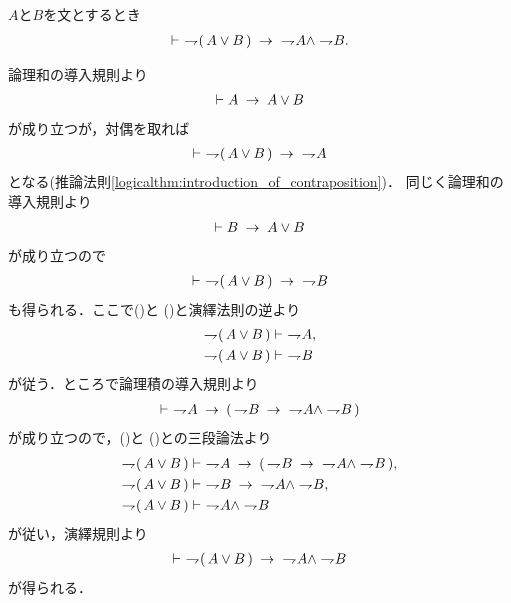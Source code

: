 	\begin{screen}
		\begin{logicalthm}
		\label{logicalthm:weak_De_Morgan_law_2}
			$A$と$B$を文とするとき
			\begin{align}
				\vdash\ \rightharpoondown\hspace{-0.25em} (\, A \vee B\, ) 
				\hspace{0.25em}\rightarrow\hspace{0.25em}\ \rightharpoondown\hspace{-0.25em} A \wedge \rightharpoondown\hspace{-0.25em} B.
			\end{align}
		\end{logicalthm}
	\end{screen}
	
	\begin{prf}
		論理和の導入規則より
		\begin{align}
			\vdash A \hspace{0.25em}\rightarrow\hspace{0.25em} A \vee B
		\end{align}
		が成り立つが，対偶を取れば
		\begin{align}
			\vdash\ \rightharpoondown\hspace{-0.25em} (\, A \vee B\, ) \hspace{0.25em}\rightarrow\hspace{0.25em}\ \rightharpoondown\hspace{-0.25em} A
			\label{fom:weak_De_Morgan_law_2_1}
		\end{align}
		となる(推論法則\ref{logicalthm:introduction_of_contraposition})．
		同じく論理和の導入規則より
		\begin{align}
			\vdash B \hspace{0.25em}\rightarrow\hspace{0.25em} A \vee B
		\end{align}
		が成り立つので
		\begin{align}
			\vdash\ \rightharpoondown\hspace{-0.25em} (\, A \vee B\, ) \hspace{0.25em}\rightarrow\hspace{0.25em}\ \rightharpoondown\hspace{-0.25em} B
			\label{fom:weak_De_Morgan_law_2_2}
		\end{align}
		も得られる．ここで()と
		()と演繹法則の逆より
		\begin{align}
			\rightharpoondown\hspace{-0.25em} (\, A \vee B\, ) &\vdash\ \rightharpoondown\hspace{-0.25em} A, 
			\label{fom:weak_De_Morgan_law_2_3} \\
			\rightharpoondown\hspace{-0.25em} (\, A \vee B\, ) &\vdash\ \rightharpoondown\hspace{-0.25em} B
			\label{fom:weak_De_Morgan_law_2_4}
		\end{align}
		が従う．ところで論理積の導入規則より
		\begin{align}
			\vdash\ \rightharpoondown\hspace{-0.25em} A \hspace{0.25em}\rightarrow\hspace{0.25em} (\, \rightharpoondown\hspace{-0.25em} B \hspace{0.25em}\rightarrow\hspace{0.25em}\
			\rightharpoondown\hspace{-0.25em} A \wedge \rightharpoondown\hspace{-0.25em} B\, )
		\end{align}
		が成り立つので，()と
		()との三段論法より
		\begin{align}
			\negation (\, A \vee B\, ) &\vdash\ \negation A \rarrow 
				(\, \negation B \rarrow\ \negation A \wedge \negation B\, ), \\
			\negation (\, A \vee B\, ) &\vdash\ 
				\negation B \rarrow\ \negation A \wedge \negation B, \\
			\negation (\, A \vee B\, ) &\vdash\ \negation A \wedge \negation B
		\end{align}
		が従い，演繹規則より
		\begin{align}
			\vdash\ \rightharpoondown\hspace{-0.25em} (\, A \vee B\, ) 
			\hspace{0.25em}\rightarrow\hspace{0.25em}\ \rightharpoondown\hspace{-0.25em} A \wedge \rightharpoondown\hspace{-0.25em} B
		\end{align}
		が得られる．
		\QED
	\end{prf}
	

